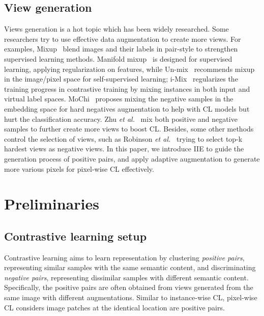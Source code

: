 \documentclass[10pt,twocolumn,letterpaper]{article}
\begin{document}
\subsection{View generation}
Views generation is a hot topic which has been widely researched. Some researchers try to use effective data augmentation to create more views. For examples, Mixup~\cite{zhang2018mixup,verma2019manifold,yun2019cutmix,kim2020mixco} blend images and their labels in pair-style to strengthen supervised learning methods.
Manifold mixup~\cite{verma2019manifold} is designed for supervised learning, applying regularization on features, while Un-mix~\cite{shen2022mix} recommends mixup in the image/pixel space for self-supervised learning; i-Mix~\cite{DBLP:conf/iclr/LeeZSLSL21} regularizes the training progress in contrastive training by mixing instances in both input and virtual label spaces. MoChi~\cite{kalantidis2020hard} proposes mixing the negative samples in the embedding space for hard negatives augmentation to help with CL models but hurt the classification accuracy. Zhu {\it et al.}~\cite{zhu2021improving} mix both positive and negative samples to further create more views to boost CL. Besides, some other methods control the selection of views, such as Robinson {\it et al.}~\cite{robinson2020contrastive} trying to select top-k hardest views as negative views. 
In this paper, we introduce IIE to guide the generation process of positive pairs, and apply adaptive augmentation to generate more various pixels for pixel-wise CL effectively. 

\section{Preliminaries}

\subsection{Contrastive learning setup}
Contrastive learning aims to learn representation by clustering \textit{positive pairs}, representing similar samples with the same semantic content, and discriminating \textit{negative pairs}, representing dissimilar samples with different semantic content. Specifically, the positive pairs are often obtained from views generated from the same image with different augmentations.
Similar to instance-wise CL, pixel-wise CL considers image patches at the identical location are positive pairs. 
\end{document}

